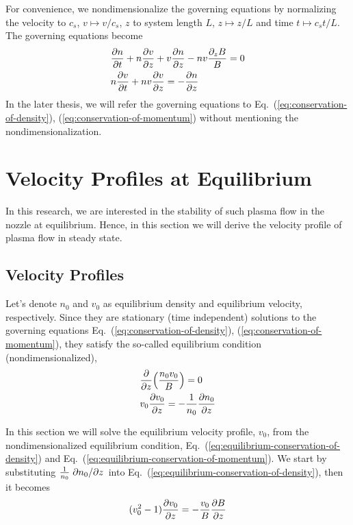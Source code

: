 For convenience, we nondimensionalize the governing equations by normalizing the velocity to $c_s$, $v\mapsto v/c_s$, $z$ to system length $L$, $z \mapsto z/L$ and time $t\mapsto c_s t/L$. The governing equations become
\begin{align}
	 & \pdv{n}{t} + n\pdv{v}{z} + v\pdv{n}{z} - nv\frac{\partial_z B}{B} = 0
	\label{eq:conservation-of-density}
	\\
	 & n\pdv{v}{t} + nv\pdv{v}{z} = -\pdv{n}{z}
	\label{eq:conservation-of-momentum}
\end{align}
In the later thesis, we will refer the governing equations to Eq.~(\ref{eq:conservation-of-density}), (\ref{eq:conservation-of-momentum}) without mentioning the nondimensionalization.

\section{Velocity Profiles at Equilibrium} \label{sec:velocity-profiles}
In this research, we are interested in the stability of such plasma flow in the nozzle at equilibrium. Hence, in this section we will derive the velocity profile of plasma flow in steady state.
\subsection{Velocity Profiles}
Let's denote $n_0$ and $v_0$ as equilibrium density and equilibrium velocity, respectively. Since they are stationary (time independent) solutions to the governing equations Eq.~(\ref{eq:conservation-of-density}), (\ref{eq:conservation-of-momentum}), they satisfy the so-called equilibrium condition (nondimensionalized),
\begin{align}
	 & \pdv{z}(\frac{n_0v_0}{B}) = 0 \label{eq:equilibrium-conservation-of-density}                 \\
	 & v_0\pdv{v_0}{z} = -\frac{1}{n_0}\pdv{n_0}{z} \label{eq:equilibrium-conservation-of-momentum}
\end{align}

In this section we will solve the equilibrium velocity profile, $v_0$, from the nondimensionalized equilibrium condition, Eq.~(\ref{eq:equilibrium-conservation-of-density}) and Eq.~(\ref{eq:equilibrium-conservation-of-momentum}).
We start by substituting $\frac{1}{n_0}\pdv*{n_0}{z}$ into Eq.~(\ref{eq:equilibrium-conservation-of-density}), then it becomes
\begin{equation}
	(v_0^2-1)\pdv{v_0}{z} = -\frac{v_0}{B}\pdv{B}{z}
\end{equation}

